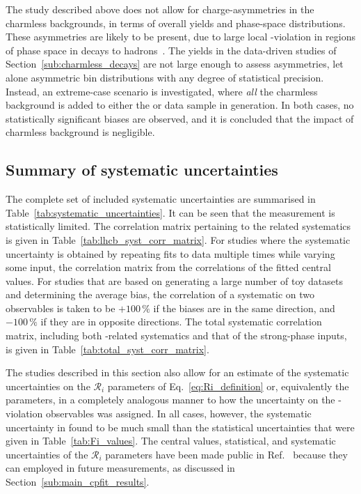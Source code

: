 The study described above does not allow for charge-asymmetries in the charmless backgrounds, in terms of overall yields and phase-space distributions. These asymmetries are likely to be present, due to large local \CP-violation in regions of phase space in \Bpm decays to hadrons~\cite{LHCB-PAPER-2014-044,LHCB-PAPER-2019-018}. The yields in the data-driven studies of Section~\ref{sub:charmless_decays} are not large enough to assess asymmetries, let alone asymmetric bin distributions with any degree of statistical precision. Instead, an extreme-case scenario is investigated, where \emph{all} the charmless background is added to either the \Bp or \Bm data sample in generation. In both cases, no statistically significant biases are observed, and it is concluded that the impact of charmless background is negligible.



\subsection{Summary of systematic uncertainties} %
\label{sub:summary_of_systematic_uncertainties}

The complete set of included systematic uncertainties are summarised in Table~\ref{tab:systematic_uncertainties}. It can be seen that the measurement is statistically limited. The correlation matrix pertaining to the \lhcb related systematics is given in Table~\ref{tab:lhcb_syst_corr_matrix}. For studies where the systematic uncertainty is obtained by repeating fits to data multiple times while varying some input, the correlation matrix from the correlations of the fitted central values. For studies that are based on generating a large number of toy datasets and determining the average bias, the correlation of a systematic on two observables is taken to be $+100\,\%$ if the biases are in the same direction, and $-100\,\%$ if they are in opposite directions. The total systematic correlation matrix, including both \lhcb-related systematics and that of the strong-phase inputs, is given in Table~\ref{tab:total_syst_corr_matrix}.





The studies described in this section also allow for an estimate of the systematic uncertainties on the $\mathcal R_i$ parameters of Eq.~\eqref{eq:Ri_definition} or, equivalently the \Fi parameters, in a completely analogous manner to how the uncertainty on the \CP-violation observables was assigned. In all cases, however, the systematic uncertainty in found to be much small than the statistical uncertainties that were given in Table~\ref{tab:Fi_values}. The central values, statistical, and systematic uncertainties of the $\mathcal R_i$ parameters have been made public in Ref.~\cite{GGSZ-B2Dh} because they can employed in future \lhcb measurements, as discussed in Section~\ref{sub:main_cpfit_results}.

